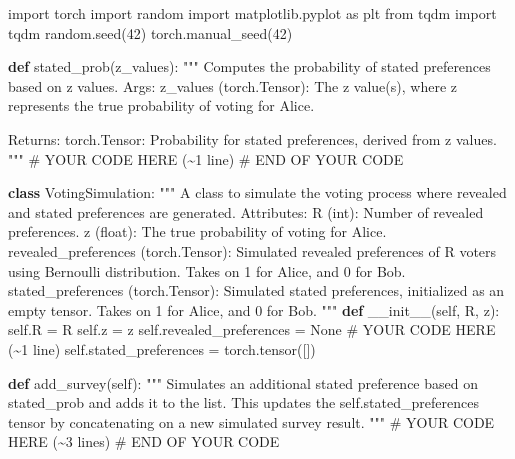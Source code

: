 \documentclass[
  letterpaper,
  numbers=noenddot,
  DIV=11,
  oneside]{scrreprt}
\newenvironment{Shaded}{\begin{snugshade}}{\end{snugshade}}
\newcommand{\CommentTok}[1]{\textcolor[rgb]{0.37,0.37,0.37}{#1}}
\newcommand{\DecValTok}[1]{\textcolor[rgb]{0.68,0.00,0.00}{#1}}
\newcommand{\FunctionTok}[1]{\textcolor[rgb]{0.28,0.35,0.67}{#1}}
\newcommand{\ImportTok}[1]{\textcolor[rgb]{0.00,0.46,0.62}{#1}}
\newcommand{\KeywordTok}[1]{\textcolor[rgb]{0.00,0.23,0.31}{\textbf{#1}}}
\newcommand{\NormalTok}[1]{\textcolor[rgb]{0.00,0.23,0.31}{#1}}
\newcommand{\OperatorTok}[1]{\textcolor[rgb]{0.37,0.37,0.37}{#1}}
\newcommand{\RegionMarkerTok}[1]{\textcolor[rgb]{0.00,0.23,0.31}{#1}}
\newcommand{\VariableTok}[1]{\textcolor[rgb]{0.07,0.07,0.07}{#1}}
\theoremstyle{remark}
\begin{document}
\begin{Shaded}
\begin{Highlighting}[numbers=left,,]
\ImportTok{import}\NormalTok{ torch}
\ImportTok{import}\NormalTok{ random}
\ImportTok{import}\NormalTok{ matplotlib.pyplot }\ImportTok{as}\NormalTok{ plt}
\ImportTok{from}\NormalTok{ tqdm }\ImportTok{import}\NormalTok{ tqdm}
\NormalTok{random.seed(}\DecValTok{42}\NormalTok{)}
\NormalTok{torch.manual\_seed(}\DecValTok{42}\NormalTok{)}

\KeywordTok{def}\NormalTok{ stated\_prob(z\_values):}
    \CommentTok{"""}
\CommentTok{    Computes the probability of stated preferences based on z values.}
\CommentTok{    }
\CommentTok{    Args:}
\CommentTok{        z\_values (torch.Tensor): The z value(s), where z represents the true probability of voting for Alice.}

\CommentTok{    Returns:}
\CommentTok{        torch.Tensor: Probability for stated preferences, derived from z values.}
\CommentTok{    """}
    \CommentTok{\# YOUR CODE HERE (\textasciitilde{}1 line)}
    \CommentTok{\# }\RegionMarkerTok{END}\CommentTok{ OF YOUR CODE}

\KeywordTok{class}\NormalTok{ VotingSimulation:}
    \CommentTok{"""}
\CommentTok{    A class to simulate the voting process where revealed and stated preferences are generated.}
\CommentTok{    }
\CommentTok{    Attributes:}
\CommentTok{        R (int): Number of revealed preferences.}
\CommentTok{        z (float): The true probability of voting for Alice.}
\CommentTok{        revealed\_preferences (torch.Tensor): Simulated revealed preferences of R voters using Bernoulli distribution.}
\CommentTok{                                             Takes on 1 for Alice, and 0 for Bob.}
\CommentTok{        stated\_preferences (torch.Tensor): Simulated stated preferences, initialized as an empty tensor.}
\CommentTok{                                           Takes on 1 for Alice, and 0 for Bob.}
\CommentTok{    """}
    \KeywordTok{def} \FunctionTok{\_\_init\_\_}\NormalTok{(}\VariableTok{self}\NormalTok{, R, z):}
        \VariableTok{self}\NormalTok{.R }\OperatorTok{=}\NormalTok{ R}
        \VariableTok{self}\NormalTok{.z }\OperatorTok{=}\NormalTok{ z}
        \VariableTok{self}\NormalTok{.revealed\_preferences }\OperatorTok{=} \VariableTok{None} \CommentTok{\# YOUR CODE HERE (\textasciitilde{}1 line)}
        \VariableTok{self}\NormalTok{.stated\_preferences }\OperatorTok{=}\NormalTok{ torch.tensor([])}

    \KeywordTok{def}\NormalTok{ add\_survey(}\VariableTok{self}\NormalTok{):}
        \CommentTok{"""}
\CommentTok{        Simulates an additional stated preference based on stated\_prob and adds it to the list.}
\CommentTok{        This updates the self.stated\_preferences tensor by concatenating on a new simulated survey result.}
\CommentTok{        """}
        \CommentTok{\# YOUR CODE HERE (\textasciitilde{}3 lines)}
        \CommentTok{\# }\RegionMarkerTok{END}\CommentTok{ OF YOUR CODE}


\end{Highlighting}
\end{Shaded}
\end{document}
